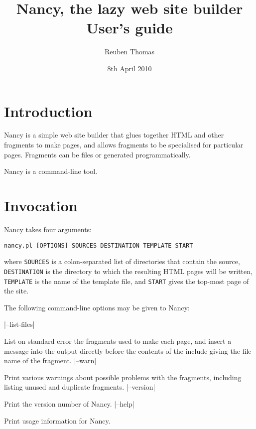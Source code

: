 \documentclass[english]{scrartcl}
\begin{document}
\title{Nancy, the lazy web site builder\\User's guide}
\date{8th April 2010}
\author{Reuben Thomas}
\maketitle

\section{Introduction}

Nancy is a simple web site builder that glues together HTML and other fragments to make pages, and allows fragments to be specialised for particular pages. Fragments can be files or generated programmatically.

Nancy is a command-line tool.

\section{Invocation}

Nancy takes four arguments:

\begin{verbatim}
nancy.pl [OPTIONS] SOURCES DESTINATION TEMPLATE START
\end{verbatim}

\noindent where \verb|SOURCES| is a colon-separated list of directories that contain the source, \verb|DESTINATION| is the directory to which the resulting HTML pages will be written, \verb|TEMPLATE| is the name of the template file, and \verb|START| gives the top-most page of the site.

The following command-line options may be given to Nancy:

\begin{description}
|--list-files|
\item[\UseVerb{listfiles}]List on standard error the fragments used to make each page, and insert a message into the output directly before the contents of the include giving the file name of the fragment.
|--warn|
\item[\UseVerb{warn}]Print various warnings about possible problems with the fragments, including listing unused and duplicate fragments.
|--version|
\item[\UseVerb{version}]Print the version number of Nancy.
|--help|
\item[\UseVerb{help}]Print usage information for Nancy.
\end{description}
\end{document}
